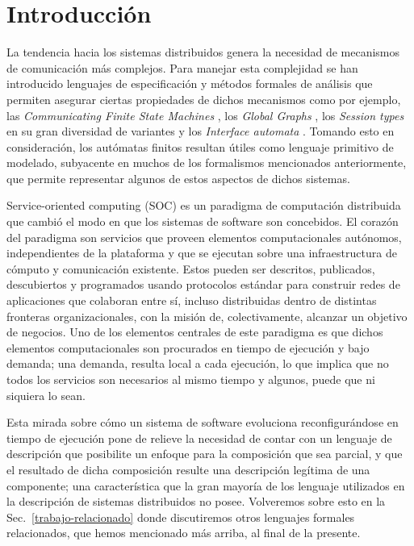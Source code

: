 \chapter{Introducción}
La tendencia hacia los sistemas distribuidos genera la necesidad de mecanismos de comunicación más complejos. Para manejar esta complejidad se han introducido lenguajes de especificación y métodos formales de análisis que permiten asegurar ciertas propiedades de dichos mecanismos como por ejemplo, las \emph{Communicating Finite State Machines} \cite{brand:jacm-30_2}, los \emph{Global Graphs} \cite{castagna:lmcs-8_1}, los \emph{Session types} en su gran diversidad de variantes \cite{honda:esop98,honda:popl08} y los \emph{Interface automata} \cite{dealfaro:esec-fse-01}. Tomando esto en consideración, los autómatas finitos \cite[Def.~2.2.1]{hopcroft01} resultan útiles como lenguaje primitivo de modelado, subyacente en muchos de los formalismos mencionados anteriormente, que permite representar algunos de estos aspectos de dichos sistemas.

Service-oriented computing (SOC) es un paradigma de computación distribuida que cambió el modo en que los sistemas de software son concebidos. El corazón del paradigma son servicios que proveen elementos computacionales autónomos, independientes de la plataforma y que se ejecutan sobre una infraestructura de cómputo y comunicación existente. Estos pueden ser descritos, publicados, descubiertos y programados usando protocolos estándar para construir redes de aplicaciones que colaboran entre sí, incluso distribuidas dentro de distintas fronteras organizacionales, con la misión de, colectivamente, alcanzar un objetivo de negocios. Uno de los elementos centrales de este paradigma es que dichos elementos computacionales son procurados en tiempo de ejecución y bajo demanda; una demanda, resulta local a cada ejecución, lo que implica que no todos los servicios son necesarios al mismo tiempo y algunos, puede que ni siquiera lo sean.

Esta mirada sobre cómo un sistema de software evoluciona reconfigurándose en tiempo de ejecución pone de relieve la necesidad de contar con un lenguaje de descripción que posibilite un enfoque para la composición que sea parcial, y que el resultado de dicha composición resulte una descripción legítima de una componente; una característica que la gran mayoría de los lenguaje utilizados en la descripción de sistemas distribuidos no posee. Volveremos sobre esto en la Sec.~\ref{trabajo-relacionado} donde discutiremos otros lenguajes formales relacionados, que hemos mencionado más arriba, al final de la presente.\\

